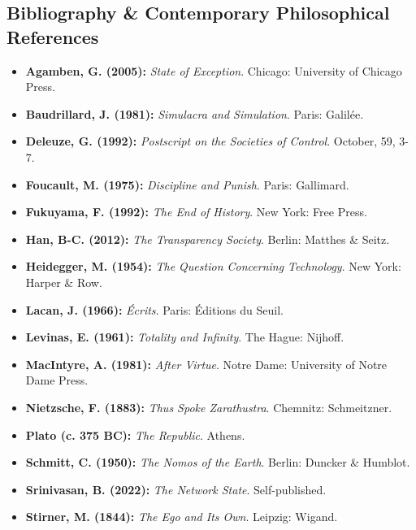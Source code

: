 \documentclass[12pt,a4paper,oneside]{report}
\begin{document}
\begin{appendices}
\chapter{Bibliography \& Contemporary Philosophical References}
\begin{itemize}[leftmargin=1.5cm, labelsep=0.5cm]
    \item \textbf{Agamben, G. (2005):} \textit{State of Exception}. Chicago: University of Chicago Press.
    \item \textbf{Baudrillard, J. (1981):} \textit{Simulacra and Simulation}. Paris: Galilée.
    \item \textbf{Deleuze, G. (1992):} \textit{Postscript on the Societies of Control}. October, 59, 3-7.
    \item \textbf{Foucault, M. (1975):} \textit{Discipline and Punish}. Paris: Gallimard.
    \item \textbf{Fukuyama, F. (1992):} \textit{The End of History}. New York: Free Press.
    \item \textbf{Han, B-C. (2012):} \textit{The Transparency Society}. Berlin: Matthes \& Seitz.
    \item \textbf{Heidegger, M. (1954):} \textit{The Question Concerning Technology}. New York: Harper \& Row.
    \item \textbf{Lacan, J. (1966):} \textit{Écrits}. Paris: Éditions du Seuil.
    \item \textbf{Levinas, E. (1961):} \textit{Totality and Infinity}. The Hague: Nijhoff.
    \item \textbf{MacIntyre, A. (1981):} \textit{After Virtue}. Notre Dame: University of Notre Dame Press.
    \item \textbf{Nietzsche, F. (1883):} \textit{Thus Spoke Zarathustra}. Chemnitz: Schmeitzner.
    \item \textbf{Plato (c. 375 BC):} \textit{The Republic}. Athens.
    \item \textbf{Schmitt, C. (1950):} \textit{The Nomos of the Earth}. Berlin: Duncker \& Humblot.
    \item \textbf{Srinivasan, B. (2022):} \textit{The Network State}. Self-published.
    \item \textbf{Stirner, M. (1844):} \textit{The Ego and Its Own}. Leipzig: Wigand.
\end{itemize}
\end{appendices}
\end{document}
